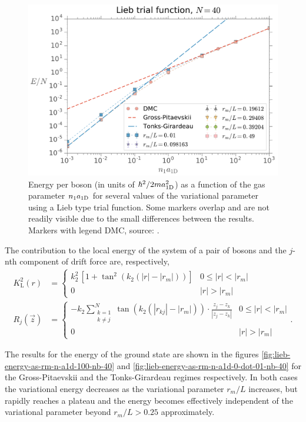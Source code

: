 %
\begin{figure}[t!]
	\centering
	\includegraphics[width=0.75\linewidth]{./figures/lieb_energy-as-n-a1d_rm-var_Nb-40}
	\caption{ Energy per boson (in units of $\hbar^2/2ma_{ \mathrm{1D} }^2$) as a function
		of the gas parameter ${{n}_1} a_{ \mathrm{1D} }$ for several values of the
		variational parameter using a Lieb type trial function.  Some markers
		overlap and are not readily visible due to the small differences between the
		results. Markers with 	legend {DMC}, source:
		\cite{bib:astrakharchik-phys-rev-a.68.031602.2003}. }
	\label{fig:lieb-energy-as-n-a1d-rm-var-nb-40}
\end{figure}
%
The contribution to the local energy of the system of a pair of bosons and the
$j$-nth component of drift force are, respectively,
%
\begin{align}
	K_{\mathrm{L}}^2(r) &= \begin{cases}
		k_2^2 \, [1 + \tan^2(k_2(|r| - |r_m|))] & 0 \leq |r| < |r_m| \\
		0 &  |r| > |r_m|
	\end{cases} \\
	R_{j}(\vec z) & = \begin{cases}
		-k_2 \displaystyle \sum_{\substack{k=1 \\ k \neq j}}^{N} \tan(k_2(|r_{kj}| - |r_m|)) \cdot \frac{z_j - z_k}{|z_j - z_k|} & 0 \leq |r| < |r_m| \\
		0 & |r| > |r_m|
	\end{cases}.
\end{align}
%

The results for the energy of the ground state are shown in the figures
\ref{fig:lieb-energy-as-rm-n-a1d-100-nb-40} and
\ref{fig:lieb-energy-as-rm-n-a1d-0-dot-01-nb-40} for the Gross-Pitaevskii and
the Tonks-Girardeau regimes respectively. In both cases the variational energy
decreases as the variational parameter $r_m / L$ increases, but rapidly reaches
a plateau and the energy becomes effectively independent of the variational
parameter beyond $r_m / L > 0.25$ approximately.


